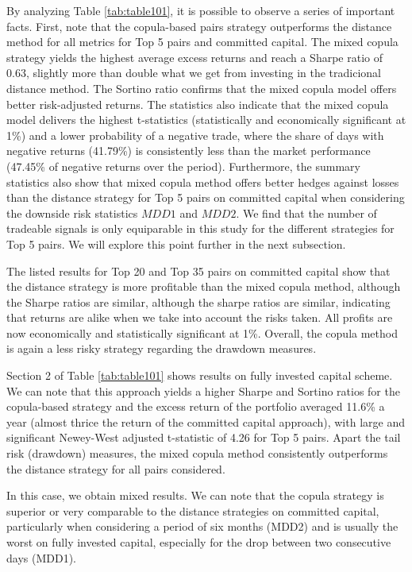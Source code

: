 \documentclass[a4paper]{article}
\begin{document}
By analyzing Table \ref{tab:table101}, it is possible to observe a series of important facts. First, note that the copula-based pairs strategy outperforms the distance method for all metrics for Top 5 pairs and committed capital. The mixed copula strategy yields the highest average excess returns and reach a Sharpe ratio of 0.63, slightly more than double what we get from investing in the tradicional distance method. The Sortino ratio confirms that the mixed copula model offers better risk-adjusted returns. The statistics also indicate that the mixed copula model delivers the highest t-statistics (statistically and economically significant at 1\%) and a lower probability of a negative trade, where the share of days with negative returns (41.79\%) is consistently less than the market performance (47.45\% of negative returns over the period). Furthermore, the summary statistics also show that mixed copula method offers better hedges against losses than the distance strategy for Top 5 pairs on committed capital when considering the downside risk statistics $MDD1$ and $MDD2$. We find that the number of tradeable signals is only equiparable in this study for the different strategies for Top 5 pairs. We will explore this point further in the next subsection.

 The listed results for Top 20 and Top 35 pairs on committed capital show that the distance strategy is more profitable than the mixed copula method, although the Sharpe ratios are similar, although the sharpe ratios are similar, indicating that returns are alike when we take into account the risks taken. All profits are now economically and statistically significant at 1\%. Overall, the copula method is again a less risky strategy regarding the drawdown measures.

Section 2 of Table \ref{tab:table101} shows results on fully invested capital scheme. We can note that this approach yields a higher Sharpe and Sortino ratios for the copula-based strategy and the excess return of the portfolio averaged 11.6\% a year (almost thrice the return of the committed capital approach), with large and significant Newey-West adjusted t-statistic of 4.26 for Top 5 pairs. Apart the tail risk (drawdown) measures, the mixed copula method consistently outperforms the distance strategy for all pairs considered.






In this case, we obtain mixed results. We can note that the copula strategy is superior or very comparable to the distance strategies on committed capital, particularly when considering a period of six months (MDD2) and is usually the worst on fully invested capital, especially for the drop between two consecutive days (MDD1).
\end{document}

